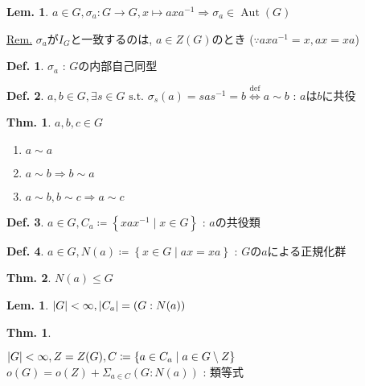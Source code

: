 \documentclass[uplatex,dvipdfmx,9pt]{beamer}
\newcommand{\defarrow}{\overset{\mathrm{def}}{\Leftrightarrow}}
\newcommand{\inverse}[1]{#1^{-1}}
\newcommand{\st}{\text{ s.t. }}
\newcommand{\lt}{\ensuremath <}
\newcommand{\Aut}{\operatorname{Aut}}
\newcounter{textThmCount}
\newcounter{textLemCount}
\theoremstyle{definition} %
\newtheorem{defn}{Def.}[subsection] %
\newtheorem{thm}{Thm.}[subsection] %
\newtheorem{thmText}[textThmCount]{Thm.}
\newtheorem{lemText}[textLemCount]{Lem.} %
\theoremstyle{example}
\begin{document}
      \begin{frame}
        
        \begin{lemText}
          $a \in G, \sigma_a \colon G \to G, x \mapsto ax\inverse{a} \Rightarrow \sigma_a \in \Aut(G)$
        \end{lemText}
        \underline{Rem.} $\sigma_a$が$I_G$と一致するのは, $a \in Z(G)$のとき ($\because ax\inverse{a} = x, ax = xa$) \\

        \begin{defn}
          $\sigma_a$ : $G$の\alert{内部自己同型}
        \end{defn}

        \begin{defn}
          $a,b \in G, \exists s \in G \st \sigma_s(a) = sa\inverse{s} = b \defarrow a \sim b$ : $a$は$b$に\alert{共役}
        \end{defn}

        \begin{thm}
          $a, b, c \in G$
          \begin{enumerate}
            \item $a \sim a$
            \item $a \sim b \Rightarrow b \sim a$
            \item $a \sim b, b \sim c \Rightarrow a \sim c$
          \end{enumerate}
        \end{thm}

      \end{frame}

      \begin{frame}

        \begin{defn}
          $a \in G, C_a \coloneqq \left\{ xa\inverse{x} \mid x \in G \right\}$ : $a$の\alert{共役類}
        \end{defn}

        \begin{defn}
          $a \in G, N(a) \coloneqq \left\{ x \in G \mid ax = xa \right\}$ : $G$の$a$による\alert{正規化群}
        \end{defn}

        \begin{thm}
          $N(a) \le G$
        \end{thm}

        \begin{lemText}
          $|G| \lt \infty, |C_a| = (G : N(a))$
        \end{lemText}

        \begin{thmText}
          \hypertarget{thmText7-9}{}
          $|G| \lt \infty, Z = Z(G), C \coloneqq \left\{ a \in C_a \mid  a \in G \setminus Z \right\}$ \\
          $o(G) = o(Z) + \Sigma_{a \in C} (G : N(a))$ : \alert{類等式}
        \end{thmText}
        
      \end{frame}
\end{document}
